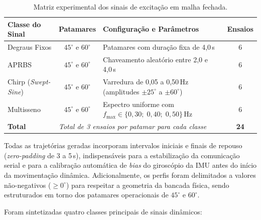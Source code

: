 \begin{table}[H]
    \centering
    \caption{Matriz experimental dos sinais de excitação em malha fechada.}
    \label{tab:ranges_angulos}
    \begin{tabular}{l c p{7.5cm} c}
        \toprule
        \textbf{Classe do Sinal} & \textbf{Patamares} & \textbf{Configuração e Parâmetros} & \textbf{Ensaios} \\ \midrule
        Degraus Fixos   & $45^\circ$ e $60^\circ$ & Patamares com duração fixa de 4,0\,s & 6 \\
        APRBS           & $45^\circ$ e $60^\circ$ & Chaveamento aleatório entre 2,0 e 4,0\,s & 6 \\
        Chirp (\textit{Swept-Sine}) & $45^\circ$ e $60^\circ$ & Varredura de 0,05 a 0,50\,Hz (amplitudes $\pm 25^\circ$ a $\pm 60^\circ$) & 6 \\
        Multisseno      & $45^\circ$ e $60^\circ$ & Espectro uniforme com $f_{\max} \in \{0{,}30;\; 0{,}40;\; 0{,}50\}$\,Hz & 6 \\ \midrule
        \textbf{Total}  & \multicolumn{2}{l}{\textit{Total de 3 ensaios por patamar para cada classe}} & \textbf{24} \\ \bottomrule
    \end{tabular}
\end{table}



Todas as trajetórias geradas incorporam intervalos iniciais e finais de repouso (\textit{zero-padding} de 3 a 5\,s), indispensáveis para a estabilização da comunicação serial e para a calibração automática de \textit{bias} do giroscópio da IMU antes do início da movimentação dinâmica. Adicionalmente, os perfis foram delimitados a valores não-negativos ($\ge 0^\circ$) para respeitar a geometria da bancada física, sendo estruturados em torno dos patamares operacionais de $45^\circ$ e $60^\circ$.

Foram sintetizadas quatro classes principais de sinais dinâmicos:


